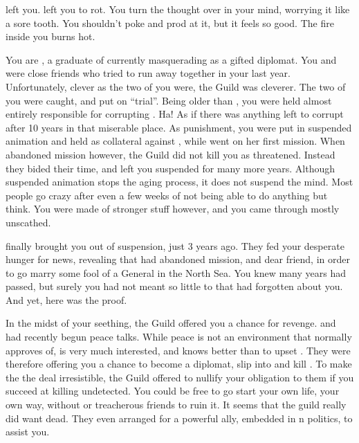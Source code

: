 \documentclass[char]{NeptuneBall}
\begin{document}
\name{\cDiplomat{}}


\cQueen{\They} left you. \cQueen{\They} left you to rot. You turn the thought over in your mind, worrying it like a sore tooth. You shouldn't poke and prod at it, but it feels so good. The fire inside you burns hot.

You are \cDiplomat{}, a graduate of \pAssassin{} currently masquerading as a gifted diplomat. You and \cQueen{} were close friends who tried to run away together in your last year. Unfortunately, clever as the two of you were, the Guild was cleverer. The two of you were caught, and put on ``trial''. Being older than \cQueen{}, you were held almost entirely responsible for corrupting \cQueen{\them}. Ha! As if there was anything left to corrupt after 10 years in that miserable place. As punishment, you were put in suspended animation and held as collateral against \cQueen{}, while \cQueen{\they} went on her first mission. When \cQueen{} abandoned \cQueen{\them} mission however, the Guild did not kill you as threatened. Instead they bided their time, and left you suspended for many more years. Although suspended animation stops the aging process, it does not suspend the mind. Most people go crazy after even a few weeks of not being able to do anything but think. You were made of stronger stuff however, and you came through mostly unscathed.

\pAssassin{} finally brought you out of suspension, just 3 years ago. They fed your desperate hunger for news, revealing that \cQueen{} had abandoned \cQueen{\them} mission, and \cQueen{\them} dear friend, in order to go marry some fool of a General in the North Sea. You knew many years had passed, but surely you had not meant so little to \cQueen{} that \cQueen{\they} had forgotten about you. And yet, here was the proof.  

In the midst of your seething, the Guild offered you a chance for revenge.  \pAtlantis{} and \pPacifica{} had recently begun peace talks. While peace is not an environment that \pAssassin{} normally approves of, \cPacificanRuler{\King} \cPacificanRuler{} is very much interested, and \pAssassin{} knows better than to upset \cPacificanRuler{\them}. They were therefore offering you a chance to become a diplomat, slip into \pAtlantis{} and kill \cQueen{}. To make the the deal irresistible, the Guild offered to nullify your obligation to them if you succeed at killing \cQueen{\them} undetected. You could be free to go start your own life, your own way, without \pAssassin{} or treacherous friends to ruin it. It seems that the guild really did want \cQueen{} dead. They even arranged for a powerful ally, embedded in \pAtlantis{}n politics, to assist you.
\end{document}
